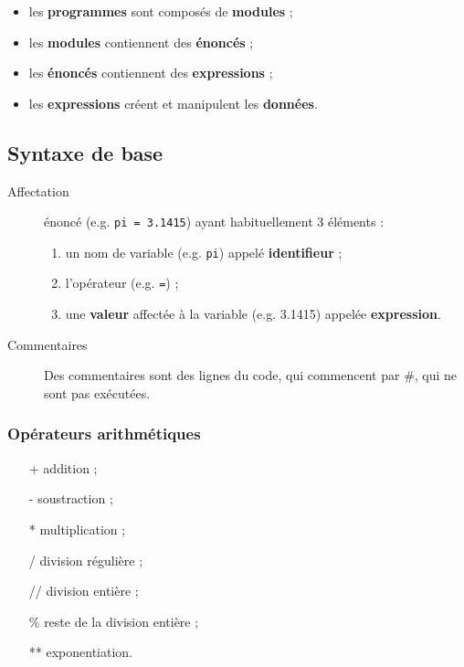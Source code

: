 \documentclass[10pt, french]{article}
\begin{document}
\begin{multicols*}{2}
\begin{definitionNOHFILLpropos}
\begin{itemize}
	\item	les \textbf{programmes} sont composés de \textbf{modules} ;        
	\item	les \textbf{modules} contiennent des \textbf{énoncés} ;            
	\item	les \textbf{énoncés} contiennent des \textbf{expressions} ;        
	\item	les \textbf{expressions} créent et manipulent les \textbf{données}.
\end{itemize}
\end{definitionNOHFILLpropos}



\subsection{Syntaxe de base}
\begin{description}
	\item[Affectation]	énoncé (e.g. \texttt{pi = 3.1415}) ayant habituellement 3 éléments :
		\begin{enumerate}[label = \rectangled{\arabic*}{lightgray}]
		\item	un nom de variable (e.g. \texttt{pi}) appelé \textbf{identifieur} ;
		\item	l'opérateur (e.g. \texttt{=}) ;
		\item	une \textbf{valeur} affectée à la variable (e.g. 3.1415) appelée \textbf{expression}.
		\end{enumerate}
	\item[Commentaires]	Des commentaires sont des lignes du code, qui commencent par \#, qui ne sont pas exécutées.
\end{description}
	
	
\subsubsection{Opérateurs arithmétiques}
\begin{itemize}[leftmargin = 5mm]
	\item[+]	addition ;
	\item[-]	soustraction ;
	\item[*]	multiplication ;
	\item[/]	division régulière ;
	\item[//]	division entière ;
	\item[\%]	reste de la division entière ;
	\item[**]	exponentiation.
\end{itemize}



\end{multicols*}
\end{document}
